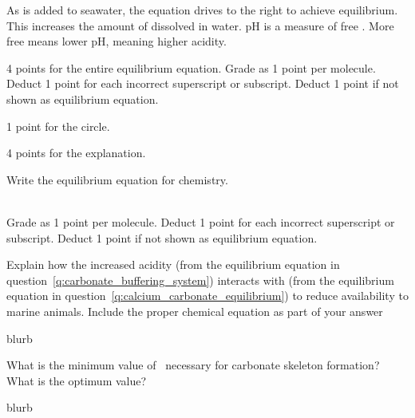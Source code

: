 \documentclass[11pt, addpoints]{exam}
\newcommand*\AnswerBox[2]{%
    \parbox[t][#1]{0.92\textwidth}{%
    \begin{solution}#2\end{solution}}
    \vspace*{\stretch{1}}
}
\newenvironment{AnswerPage}[1]
    {\begin{minipage}[t][#1]{0.92\textwidth}%
    \begin{solution}}
    {\end{solution}\end{minipage}
    \vspace*{\stretch{1}}}
\newlength{\basespace}
\begin{document}
{\begin{questions}
\begin{AnswerPage}{6\basespace}%


\vspace{\baselineskip}

As  is added to seawater, the equation drives to the right to achieve equilibrium. This increases the amount of  dissolved in water. pH is a measure of free .  More free  means lower pH, meaning higher acidity.

\vspace{\baselineskip}

4 points for the entire equilibrium equation. Grade as 1 point per molecule. Deduct 1 point for each incorrect superscript or subscript. Deduct 1 point if not shown as equilibrium equation.

1 point for the circle. 

4 points for the explanation.

\end{AnswerPage}

\question[5] \label{q:calcium_carbonate_equilibrium}
Write the equilibrium equation for  chemistry.

\AnswerBox{1\basespace}{%
   \\
Grade as 1 point per molecule. Deduct 1 point for each incorrect superscript or subscript. Deduct 1 point if not shown as equilibrium equation.
}
\newpage

\question[10]
Explain how the increased acidity (from the equilibrium equation in
question~\ref{q:carbonate_buffering_system}) interacts with  (from the equilibrium equation in question~\ref{q:calcium_carbonate_equilibrium})
to reduce  availability to marine animals. Include
the proper chemical equation as part of your answer 

\AnswerBox{0.5\textheight}{blurb}

\question[5]
What is the minimum value of \Omega\ necessary for carbonate skeleton
formation? What is the optimum value?

\AnswerBox{0.1\textheight}{blurb}

\newpage

%



\end{questions}}
\end{document}
